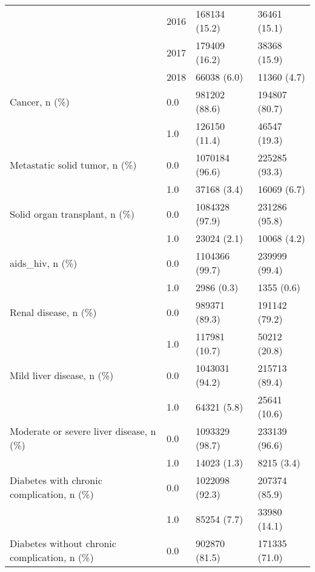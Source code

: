 \begin{tabular}{llll}
                                       & 2016 &            168134 (15.2) &      36461 (15.1) \\
                                       & 2017 &            179409 (16.2) &      38368 (15.9) \\
                                       & 2018 &              66038 (6.0) &       11360 (4.7) \\
Cancer, n (\%) & 0.0 &            981202 (88.6) &     194807 (80.7) \\
                                       & 1.0 &            126150 (11.4) &      46547 (19.3) \\
Metastatic solid tumor, n (\%) & 0.0 &           1070184 (96.6) &     225285 (93.3) \\
                                       & 1.0 &              37168 (3.4) &       16069 (6.7) \\
Solid organ transplant, n (\%) & 0.0 &           1084328 (97.9) &     231286 (95.8) \\
                                       & 1.0 &              23024 (2.1) &       10068 (4.2) \\
aids\_hiv, n (\%) & 0.0 &           1104366 (99.7) &     239999 (99.4) \\
                                       & 1.0 &               2986 (0.3) &        1355 (0.6) \\
Renal disease, n (\%) & 0.0 &            989371 (89.3) &     191142 (79.2) \\
                                       & 1.0 &            117981 (10.7) &      50212 (20.8) \\
Mild liver disease, n (\%) & 0.0 &           1043031 (94.2) &     215713 (89.4) \\
                                       & 1.0 &              64321 (5.8) &      25641 (10.6) \\
Moderate or severe liver disease, n (\%) & 0.0 &           1093329 (98.7) &     233139 (96.6) \\
                                       & 1.0 &              14023 (1.3) &        8215 (3.4) \\
Diabetes with chronic complication, n (\%) & 0.0 &           1022098 (92.3) &     207374 (85.9) \\
                                       & 1.0 &              85254 (7.7) &      33980 (14.1) \\
Diabetes without chronic complication, n (\%) & 0.0 &            902870 (81.5) &     171335 (71.0) \\

\end{tabular}
